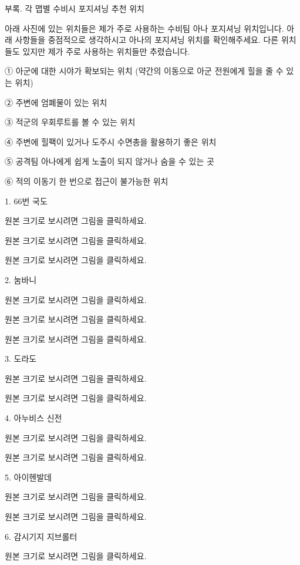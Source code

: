  


 

부록. 각 맵별 수비시 포지셔닝 추천 위치


아래 사진에 있는 위치들은 제가 주로 사용하는 수비팀 아나 포지셔닝 위치입니다. 아래 사항들을 중점적으로 생각하시고 아나의 포지셔닝 위치를 확인해주세요. 다른 위치들도 있지만 제가 주로 사용하는 위치들만 추렸습니다.


① 아군에 대한 시야가 확보되는 위치 (약간의 이동으로 아군 전원에게 힐을 줄 수 있는 위치)

② 주변에 엄폐물이 있는 위치

③ 적군의 우회루트를 볼 수 있는 위치

④ 주변에 힐팩이 있거나 도주시 수면총을 활용하기 좋은 위치

⑤ 공격팀 아나에게 쉽게 노출이 되지 않거나 숨을 수 있는 곳

⑥ 적의 이동기 한 번으로 접근이 불가능한 위치



1. 66번 국도


원본 크기로 보시려면 그림을 클릭하세요.


원본 크기로 보시려면 그림을 클릭하세요.

 

원본 크기로 보시려면 그림을 클릭하세요.



2. 눔바니


원본 크기로 보시려면 그림을 클릭하세요.


원본 크기로 보시려면 그림을 클릭하세요.


원본 크기로 보시려면 그림을 클릭하세요.



3. 도라도


원본 크기로 보시려면 그림을 클릭하세요.


원본 크기로 보시려면 그림을 클릭하세요.



4. 아누비스 신전


원본 크기로 보시려면 그림을 클릭하세요.


원본 크기로 보시려면 그림을 클릭하세요.



5. 아이헨발데


원본 크기로 보시려면 그림을 클릭하세요.


원본 크기로 보시려면 그림을 클릭하세요.



6. 감시기지 지브롤터


원본 크기로 보시려면 그림을 클릭하세요.


